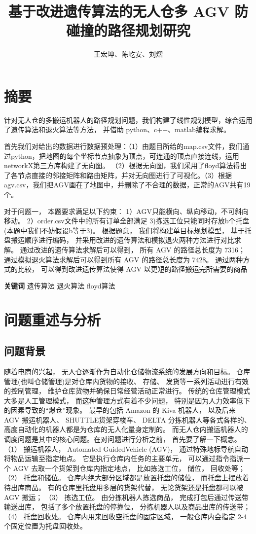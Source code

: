 \documentclass{article}
\title{基于改进遗传算法的无人仓多 AGV 防碰撞的路径规划研究}
\author{王宏坤、陈屹安、刘熠}
\begin{document}
\maketitle


\section{摘要}

	针对无人仓的多搬运机器人的路径规划问题，我们构建了线性规划模型，综合运用了遗传算法和退火算法等方法， 并借助 python、c++、matlab编程求解。
	
	首先我们对给出的数据进行数据预处理：（1）由题目所给的map.csv文件，我们通过python，把地图的每个坐标节点抽象为顶点，可连通的顶点直接连线，运用networkX第三方库构建了无向图。 （2）根据无向图，我们采用了floyd算法得出了各节点直接的邻接矩阵和路由矩阵，并对无向图进行了可视化。（3）根据agv.csv，我们把AGV画在了地图中，并删除了不合理的数据，正常的AGV共有19个。
	
	
对于问题一， 本题要求满足以下约束： 1）AGV只能横向、纵向移动，不可斜向移动。 2）order.csv文件中的所有订单全部满足 3)拣选工位只能同时存放b个托盘(本题中我们不妨假设b等于3)。 
 根据题意， 我们将构建单目标规划模型， 基于托盘搬运顺序进行编码， 并采用改进的遗传算法和模拟退火两种方法进行对比求解。 通过改进的遗传算法求解后可以得到， 所有 AGV 的路径总长度为 7316； 通过模拟退火算法求解后可以得到所有 AGV 的路径总长度为 7428。 通过两种方式的比较， 可以得到改进遗传算法使得 AGV 以更短的路径搬运完所需要的商品
 
 
 
 
 \textbf{关键词} 遗传算法 退火算法 floyd算法
 
\section{问题重述与分析}

\subsection{问题背景}
随着电商的兴起， 无人仓逐渐作为自动化仓储物流系统的发展方向和目标。 仓库管理(也叫仓储管理)是对仓库内货物的接收、 存储、 发货等一系列活动进行有效的控制管理， 维护仓库货物并确保日常经营活动正常进行。 传统的仓库管理模式大多是人工管理模式， 而这种管理方式有着不少问题， 特别是因为人力效率低下的因素导致的“爆仓”现象。 最早的包括 Amazon 的 Kiva 机器人， 以及后来 AGV 搬运机器人、 SHUTTLE货架穿梭车、 DELTA 分拣机器人等各式各样的、 高度自动化的机器人都是为仓库的无人化量身定制的。 而无人仓内搬运机器人的调度问题是其中的核心问题。在对问题进行分析之前， 首先要了解一下概念。（1） 搬运机器人， Automated GuidedVehicle (AGV)， 通过特殊地标导航自动将物品运输至指定地点。 它是执行仓库内任务的主要单元， 可以通过指令指派一个 AGV 去取一个货架到仓库内指定地点， 比如拣选工位， 储位， 回收处等； （2） 托盘和储位。 仓库内绝大部分区域都是放置托盘的储位， 而托盘上摆放着待出库商品。 有的仓库里托盘用多层的货架代替， 无论货架还是托盘都可以被 AGV 搬运； （3） 拣选工位。 由分拣机器人拣选商品， 完成打包后通过传送带输送出库， 包括了多个放置托盘的停靠位， 分拣机器人以及商品出库的传送带； （4） 托盘回收处。 仓库内用来回收空托盘的固定区域， 一般仓库内会指定 2-4 个固定位置为托盘回收处。
\end{document}
